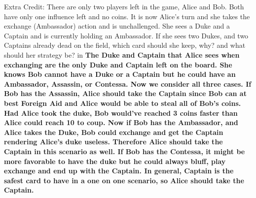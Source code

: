 \documentclass[11.5pt]{article}
\begin{document}
\vskip 0.16in

\newpage

\noindent Extra Credit: There are only two players left in the game, Alice and Bob. Both have only one influence left and no coins. It is now Alice's turn and she takes the exchange (Ambassador) action and is unchallenged. She sees a Duke and a Captain and is currently holding an Ambassador. If she sees two Dukes, and two Captains already dead on the field, which card should she keep, why? and what should her strategy be?
 in
\indent \textbf{The Duke and Captain that Alice sees when exchanging are the only Duke and Captain left on the board. She knows Bob cannot have a Duke or a Captain but he could have an Ambassador, Assassin, or Contessa. Now we consider all three cases. If Bob has the Assassin, Alice should take the Captain since Bob can at best Foreign Aid and Alice would be able to steal all of Bob's coins. Had Alice took the duke, Bob would've reached 3 coins faster than Alice could reach 10 to coup. Now if Bob has the Ambassador, and Alice takes the Duke, Bob could exchange and get the Captain rendering Alice's duke useless. Therefore Alice should take the Captain in this scenario as well. If Bob has the Contessa, it might be more favorable to have the duke but he could always bluff, play exchange and end up with the Captain. In general, Captain is the safest card to have in a one on one scenario, so Alice should take the Captain.}
\end{document}
